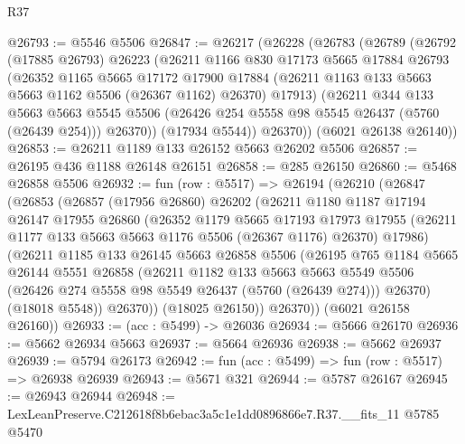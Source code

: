 \begin{lexlean}{R37}
\begin{coremodule}
@26793 := @5546 @5506
@26847 := @26217
    (@26228
      (@26783
        (@26789
          (@26792
            (@17885 @26793)
            @26223
            (@26211
              @1166
              @830
              @17173
              @5665
              @17884
              @26793
              (@26352
                @1165
                @5665
                @17172
                @17900
                @17884
                (@26211 @1163 @133 @5663 @5663 @1162 @5506 (@26367 @1162) @26370)
                @17913)
              (@26211
                @344
                @133
                @5663
                @5663
                @5545
                @5506
                (@26426 @254 @5558 @98 @5545 @26437 (@5760 (@26439 @254)))
                @26370))
            (@17934 @5544))
          @26370))
      (@6021 @26138 @26140))
@26853 := @26211 @1189 @133 @26152 @5663 @26202 @5506
@26857 := @26195 @436 @1188 @26148 @26151
@26858 := @285 @26150
@26860 := @5468 @26858 @5506
@26932 := fun (row : @5517) =>
  @26194
    (@26210
      (@26847
        (@26853
          (@26857
            (@17956 @26860)
            @26202
            (@26211
              @1180
              @1187
              @17194
              @26147
              @17955
              @26860
              (@26352
                @1179
                @5665
                @17193
                @17973
                @17955
                (@26211 @1177 @133 @5663 @5663 @1176 @5506 (@26367 @1176) @26370)
                @17986)
              (@26211
                @1185
                @133
                @26145
                @5663
                @26858
                @5506
                (@26195
                  @765
                  @1184
                  @5665
                  @26144
                  @5551
                  @26858
                  (@26211
                    @1182
                    @133
                    @5663
                    @5663
                    @5549
                    @5506
                    (@26426 @274 @5558 @98 @5549 @26437 (@5760 (@26439 @274)))
                    @26370)
                  (@18018 @5548))
                @26370))
            (@18025 @26150))
          @26370))
      (@6021 @26158 @26160))
@26933 := (acc : @5499) -> @26036
@26934 := @5666 @26170
@26936 := @5662 @26934 @5663
@26937 := @5664 @26936
@26938 := @5662 @26937
@26939 := @5794 @26173
@26942 := fun (acc : @5499) => fun (row : @5517) => @26938 @26939
@26943 := @5671 @321
@26944 := @5787 @26167
@26945 := @26943 @26944
@26948 := LexLeanPreserve.C212618f8b6ebac3a5c1e1dd0896866e7.R37.__fits_11 @5785 @5470

\end{coremodule}
\end{lexlean}
